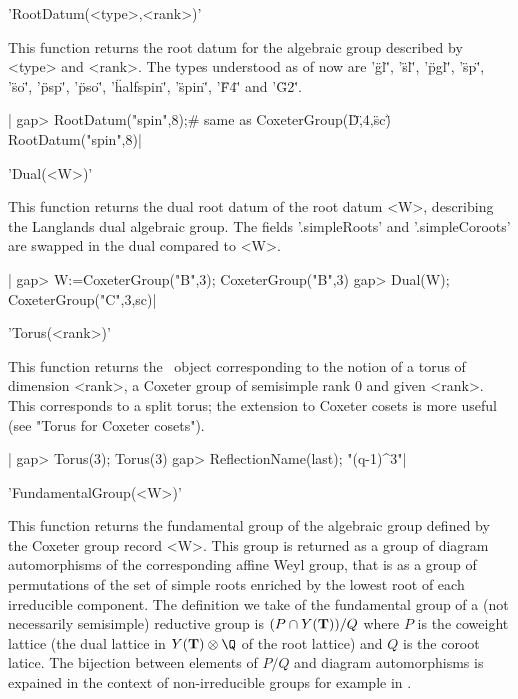 
'RootDatum(<type>,<rank>)'

This  function returns the root datum  for the algebraic group described by
<type> and <rank>. The types understood as of now are\: '\"gl\"', '\"sl\"',
'\"pgl\"',   '\"sp\"',  '\"so\"',   '\"psp\"',  '\"pso\"',  '\"halfspin\"',
'\"spin\"', '\"F4\"' and '\"G2\"'.

|    gap> RootDatum("spin",8);# same as CoxeterGroup(\"D\",4,\"sc\")
    RootDatum("spin",8)|


'Dual(<W>)'

This function returns the dual root datum of the root datum <W>, describing
the   Langlands  dual  algebraic  group.   The  fields  '.simpleRoots'  and
'.simpleCoroots' are swapped in the dual compared to <W>.

|    gap> W:=CoxeterGroup("B",3);
    CoxeterGroup("B",3)
    gap> Dual(W);
    CoxeterGroup("C",3,sc)|


'Torus(<rank>)'

This  function returns the \CHEVIE\ object corresponding to the notion of a
torus  of dimension <rank>, a Coxeter group  of semisimple rank 0 and given
<rank>.  This corresponds to a split torus; the extension to Coxeter cosets
is more useful (see "Torus for Coxeter cosets").

|    gap> Torus(3);
    Torus(3)
    gap> ReflectionName(last);
    "(q-1)^3"|


'FundamentalGroup(<W>)'

This  function returns the fundamental group of the algebraic group defined
by  the Coxeter  group record  <W>. This  group is  returned as  a group of
diagram  automorphisms of the corresponding affine Weyl group, that is as a
group  of permutations of  the set of  simple roots enriched  by the lowest
root  of  each  irreducible  component.  The  definition  we  take  of  the
fundamental  group  of  a  (not  necessarily semisimple) reductive group is
$(P\cap  Y({\mathbf T}))/Q$ where $P$ is the  coweight lattice (the dual lattice in
$Y(\bT)\otimes\Q$  of the root  lattice) and $Q$  is the coroot latice. The
bijection  between elements of $P/Q$  and diagram automorphisms is expained
in   the  context  of  non-irreducible   groups  for  example  in  \cite[\S
3.B]{Bon05}.

